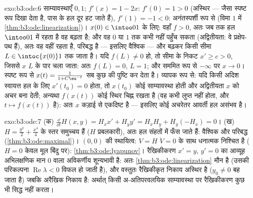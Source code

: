 \begin{solution}{exo:b3:ode:6}
साम्यावस्थाएँ $0, 1$; $f'(x) = 1 - 2x$: $f'(0) = 1 > 0$ (अस्थिर --- जैसा स्पष्ट रूप दिखा देता
है, पास के हल दूर हट जाते हैं), $f'(1) = -1 < 0$: अनंतस्पर्शी रूप से 
(विमा $1$ में \cref{thm:b3:ode:linearization})। $x(0) \in \intoo01$ के लिए: वहाँ $f > 0$, अतः जब तक हल $\intoo01$ में
रहता है वह बढ़ता है; और वह $0$ या $1$ तक कभी नहीं पहुँच सकता
(अद्वितीयता: वे प्रक्षेप-पथ हैं), अतः वह वहीं रहता है, परिबद्ध है
--- इसलिए वैश्विक --- और बढ़कर किसी सीमा $L
\in \intoc{x(0)}1$ तक जाता है। यदि $f(L) \neq 0$
हो, तो सीमा के निकट $x' \geq c > 0$, जिससे $x$ $L$ के पार चला जाता: अतः $f(L) = 0$,
$L = 1$; और सममित रूप से $-\infty$ पर $x \to 0$। स्पष्ट रूप से $x(t) =
\frac1{1 + C\eu^{-t}}$ सब कुछ की
पुष्टि कर देता है। व्यापक रूप से: यदि किसी अदिश स्वायत्त हल के लिए
$x'(t_0) = 0$ होता, तो $x(t_0)$ कोई साम्यावस्था होती और अद्वितीयता $x$ को अचर
बना देती; अन्यथा $f(x(t))$ कोई स्थिर चिह्न रखता है (वह कभी लुप्त नहीं
होता, और $t \mapsto f(x(t))$  है): अतः $x$ कड़ाई से एकदिष्ट है --- इसलिए कोई
अचरेतर आवर्ती हल असंभव है।
\end{solution}

\begin{solution}{exo:b3:ode:7}
(क) $\frac{\dd}{\dd t}H(x,y) = H_xx' + H_yy' = H_xH_y +
H_y(-H_x) = 0$।
(ख) $H = \frac{y^2}2 + \frac{x^4}4$ के स्तर समुच्चय  हैं ($H$ प्रबलकारी), अतः हल संहतों
में फँस जाते हैं: वैश्विक और परिबद्ध (\cref{thm:b3:ode:maximal})। $(0,0)$ की स्थायित्व:
$V = H$ $\dot V = 0$ के साथ धनात्मक निश्चित है ($H = 0$ केवल मूल बिंदु पर):
\cref{thm:b3:ode:lyapunov}। रैखिकीकरण $x' = y$, $y' = 0$ का आव्यूह अभिलक्षणिक मान $0$ वाला
अविकर्णीय शून्यभावी है: अतः \cref{thm:b3:ode:linearization} मौन है (उसकी परिकल्पना $\operatorname{Re}\lambda < 0$ विफल
हो जाती है), और वस्तुतः रैखिकीकृत निकाय अस्थिर है ($y_0 \ne 0$ बह जाता है)
जबकि अरैखिक निकाय  है: अर्थात् किसी अ-अतिपरवलयिक साम्यावस्था
पर रैखिकीकरण कुछ भी सिद्ध नहीं करता।
\end{solution}

